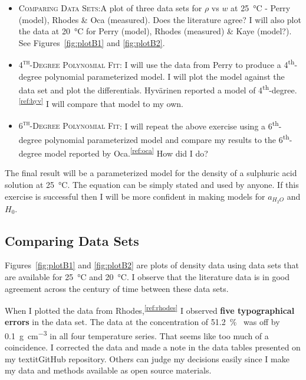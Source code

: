 \documentclass[]{tufte-handout}
\newcommand{\tss}[1]{\textsuperscript{#1}}
\begin{document}
 \begin{itemize}
 \item \textsc{Comparing Data Sets}:A plot of three data sets for $\rho$ vs $w$ at \qty{25}{\degreeCelsius} - Perry (model), Rhodes \& Oca (measured). Does the literature agree? I will also plot the data at \qty{20}{\degreeCelsius} for Perry (model), Rhodes (measured) \& Kaye (model?). See Figures~\ref{fig:plotB1} and \vref{fig:plotB2}.
 
 \item \textsc{4\tss{th}-Degree Polynomial Fit}: I will use the data from Perry to produce a 4\tss{th}-degree polynomial parameterized model. I will plot the model against the data set and plot the differentials. Hyvärinen reported a model of 4\tss{th}-degree.\tss{\ref{ref:hyv}} I will compare that model to my own.
 
 \item \textsc{6\tss{th}-Degree Polynomial Fit}: I will repeat the above exercise using a 6\tss{th}-degree polynomial parameterized model and compare my results to the 6\tss{th}-degree model reported by Oca.\tss{\ref{ref:oca}}  How did I do? %
 
 \end{itemize}
 
The final result will be a parameterized model for the density of a sulphuric acid solution at \qty{25}{\degreeCelsius}. The equation can be simply stated and used by anyone. If this exercise is successful then I will be more confident in making models for $a_{H_2O}$ and $H_0$.


\subsection{Comparing Data Sets}

Figures~\ref{fig:plotB1} and \vref{fig:plotB2} are plots of density data using data sets that are available for \qty{25}{\degreeCelsius} and \qty{20}{\degreeCelsius}. I observe that the literature data is in good agreement across the century of time between these data sets.

When I plotted the data from Rhodes,\tss{\ref{ref:rhodes}} I observed \textbf{five typographical errors} in the data set. The data at the concentration of \qty{51.2}{\percent{}} was off by \qty{+0.1}{\gram\per\centi\meter\cubed} in all four temperature series. That seems like too much of a coincidence. I corrected the data and made a note in the data tables presented on my textit{GitHub} repository. Others can judge my decisions easily since I make my data and methods available as open source materials.
\end{document}
